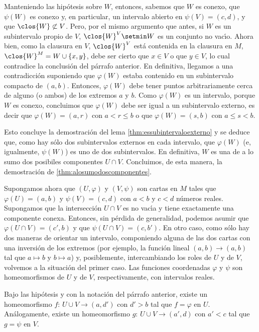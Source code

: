 Manteniendo las hip\'{o}tesis sobre $W$, entonces, sabemos que $W$ es
conexo, que $\psi(W)$ es conexo y, en particular, un intervalo abierto en
$\psi(V)=(c,d)$, y que $\clos{W}\not\subset V$. Pero, por el mismo
argumento que antes, si $W$ es un subintervalo propio de $V$,
$\clos{W}^{V}\setmin W$ es un conjunto no vac\'{\i}o. Ahora bien, como
la clausura en $V$, $\clos{W}^{V}$ est\'{a} contenida en la clausura en
$M$, $\clos{W}^{M}=W\cup\{x,y\}$, debe ser cierto que $x\in V$ o que
$y\in V$, lo cual contradice la conclusi\'{o}n del p\'{a}rrafo anterior.
En definitiva, llegamos a una contradicci\'{o}n suponiendo que
$\varphi(W)$ estaba contenido en un subintervalo compacto de $(a,b)$.
Entonces, $\varphi(W)$ debe tener puntos arbitrariamente cerca de alguno
(o ambos) de los extremos $a$ y $b$. Como $\varphi(W)$ es un intervalo,
porque $W$ es conexo, concluimos que $\varphi(W)$ debe ser igual a un
subintervalo externo, es decir que $\varphi(W)=(a,r)$ con $a<r\leq b$
o que $\varphi(W)=(s,b)$ con $a\leq s <b$.

Esto concluye la demostraci\'{o}n del lema \ref{thm:essubintervaloexterno}
y se deduce que, como hay s\'{o}lo dos subintervalos externos en cada
intervalo, que $\varphi(W)$ (e, igualmente, $\psi(W)$) es uno de dos
subintervalos. En definitiva, $W$ es una de a lo sumo dos posibiles
componentes $U\cap V$. Concluimos, de esta manera, la demostraci\'{o}n
de \ref{thm:alosumodoscomponentes}.

Supongamos ahora que $(U,\varphi)$ y $(V,\psi)$ son cartas en $M$ tales
que $\varphi(U)=(a,b)$ y $\psi(V)=(c,d)$ con $a<b$ y $c<d$ n\'{u}meros
reales. Supongamos que la intersecci\'{o}n $U\cap V$ es no vac\'{\i}a y
tiene exactamente una componente conexa. Entonces, sin p\'{e}rdida de
generalidad, podemos asumir que $\varphi(U\cap V)=(c',b)$ y que
$\psi(U\cap V)=(c,b')$. En otro caso, como s\'{o}lo hay dos maneras de
orientar un intervalo, componiendo alguna de las dos cartas con una
inversi\'{o}n de los extremos (por ejemplo, la funci\'{o}n lineal
$(a,b)\rightarrow(a,b)$ tal que $a\mapsto b$ y $b\mapsto a$) y,
posiblemente, intercambiando los roles de $U$ y de $V$, volvemos a la
situaci\'{o}n del primer caso. Las funciones coordenadas $\varphi$ y
$\psi$ son homeomorfismos de $U$ y de $V$, respectivamente, con
intervalos reales.

\begin{propoExtenderHomeoConIntervalo}\label{thm:extenderhomeoconintervalo}
	Bajo las hip\'{o}tesis y con la notaci\'{o}n del p\'{a}rrafo
	anterior, existe un homeomorfismo $f:\,U\cup V\rightarrow (a,d')$
	con $d'>b$ tal que $f=\varphi$ en $U$. An\'{a}logamente,
	existe un homeomorfismo $g:\,U\cup V\rightarrow (a',d)$
	con $a'<c$ tal que $g=\psi$ en $V$.
\end{propoExtenderHomeoConIntervalo}

